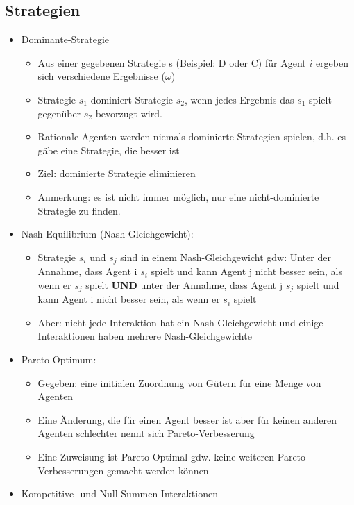 \documentclass{article} %
\begin{document}
	\subsection{Strategien}
	\begin{itemize}
		\item Dominante-Strategie
		\begin{itemize}
			\item Aus einer gegebenen Strategie s (Beispiel: D oder C) für Agent $i$ ergeben sich verschiedene Ergebnisse ($\omega$)
			\item Strategie $s_{1}$ dominiert Strategie $s_{2}$, wenn jedes Ergebnis das $s_{1}$ spielt gegenüber $s_{2}$ bevorzugt wird.
			\item Rationale Agenten werden niemals dominierte Strategien spielen, d.h. es gäbe eine Strategie, die besser ist
			\item Ziel: dominierte Strategie eliminieren
			\item Anmerkung: es ist nicht immer möglich, nur eine nicht-dominierte Strategie zu finden.
		\end{itemize}
		\item Nash-Equilibrium (Nash-Gleichgewicht):
		\begin{itemize}
			\item Strategie $s_i$ und $s_j$ sind in einem Nash-Gleichgewicht gdw: Unter der Annahme, dass Agent i $s_i$ spielt und kann Agent j nicht besser sein, als wenn er $s_j$ spielt \textbf{UND} unter der Annahme, dass Agent j $s_j$ spielt und kann Agent i nicht besser sein, als wenn er $s_i$ spielt
			\item Aber: nicht jede Interaktion hat ein Nash-Gleichgewicht und einige Interaktionen haben mehrere Nash-Gleichgewichte
		\end{itemize}
		\item Pareto Optimum:
		\begin{itemize}
			\item Gegeben: eine initialen Zuordnung von Gütern für eine Menge von Agenten
			\item Eine Änderung, die für einen Agent besser ist aber für keinen anderen Agenten schlechter nennt sich Pareto-Verbesserung
			\item Eine Zuweisung ist Pareto-Optimal gdw. keine weiteren Pareto-Verbesserungen gemacht werden können
		\end{itemize}
		\item Kompetitive- und Null-Summen-Interaktionen
		\begin{itemize}

\end{itemize}
\end{itemize}
\end{document}
